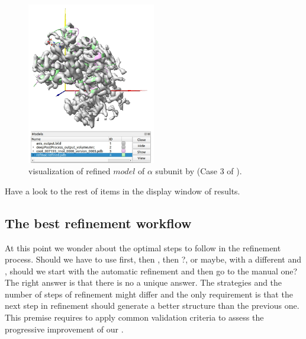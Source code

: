  \begin{figure}[H]
  \centering 
  \captionsetup{width=.9\linewidth} 
  \includegraphics[width=0.50\textwidth]{Images/Fig33}
  \caption{\chimera visualization of refined $model$ of  $\alpha$ subunit by  (Case 3 of ).}
  \label{fig:refmac_chimera}
  \end{figure}
  
  Have a look to the rest of items in the display window of results.

  
  \subsection*{The best refinement workflow}
  At this point we wonder about the optimal steps to follow in the refinement process. Should we have to use \coot first, then \phenix, then ?, or maybe, with a different  and , should we start with the automatic refinement and then go to the manual one? The right answer is that there is no a unique answer. The strategies and the number of steps of refinement might differ and the only requirement is that the next step in refinement should generate a better structure than the previous one. This premise requires to apply common validation criteria to assess the progressive improvement of our .
  
